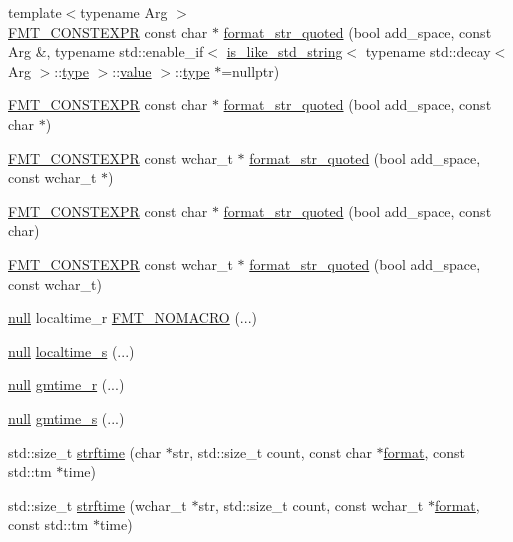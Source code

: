 \begin{DoxyCompactItemize}
\item 
{\footnotesize template$<$typename Arg $>$ }\\\hyperlink{core_8h_a69201cb276383873487bf68b4ef8b4cd}{F\+M\+T\+\_\+\+C\+O\+N\+S\+T\+E\+X\+PR} const char $\ast$ \hyperlink{namespaceinternal_a6b6d89b287d9960295aa6a1a46300b05}{format\+\_\+str\+\_\+quoted} (bool add\+\_\+space, const Arg \&, typename std\+::enable\+\_\+if$<$ \hyperlink{classinternal_1_1is__like__std__string}{is\+\_\+like\+\_\+std\+\_\+string}$<$ typename std\+::decay$<$ Arg $>$\+::\hyperlink{namespaceinternal_a8661864098ac0acff9a6dd7e66f59038}{type} $>$\+::\hyperlink{classinternal_1_1value}{value} $>$\+::\hyperlink{namespaceinternal_a8661864098ac0acff9a6dd7e66f59038}{type} $\ast$=nullptr)
\item 
\hyperlink{core_8h_a69201cb276383873487bf68b4ef8b4cd}{F\+M\+T\+\_\+\+C\+O\+N\+S\+T\+E\+X\+PR} const char $\ast$ \hyperlink{namespaceinternal_aa20fe9d203b6585b35f99cf2b5de3609}{format\+\_\+str\+\_\+quoted} (bool add\+\_\+space, const char $\ast$)
\item 
\hyperlink{core_8h_a69201cb276383873487bf68b4ef8b4cd}{F\+M\+T\+\_\+\+C\+O\+N\+S\+T\+E\+X\+PR} const wchar\+\_\+t $\ast$ \hyperlink{namespaceinternal_a4773ec73cdc3b39cffcdd4035bc5348f}{format\+\_\+str\+\_\+quoted} (bool add\+\_\+space, const wchar\+\_\+t $\ast$)
\item 
\hyperlink{core_8h_a69201cb276383873487bf68b4ef8b4cd}{F\+M\+T\+\_\+\+C\+O\+N\+S\+T\+E\+X\+PR} const char $\ast$ \hyperlink{namespaceinternal_a9ba8863a8d3f90fb4b02f679339ee868}{format\+\_\+str\+\_\+quoted} (bool add\+\_\+space, const char)
\item 
\hyperlink{core_8h_a69201cb276383873487bf68b4ef8b4cd}{F\+M\+T\+\_\+\+C\+O\+N\+S\+T\+E\+X\+PR} const wchar\+\_\+t $\ast$ \hyperlink{namespaceinternal_a058b7ff5306c068d78ebd905aa902886}{format\+\_\+str\+\_\+quoted} (bool add\+\_\+space, const wchar\+\_\+t)
\item 
\hyperlink{structinternal_1_1null}{null} localtime\+\_\+r \hyperlink{namespaceinternal_a5da151108dc35a75dd46a3fa65cc8b94}{F\+M\+T\+\_\+\+N\+O\+M\+A\+C\+RO} (...)
\item 
\hyperlink{structinternal_1_1null}{null} \hyperlink{namespaceinternal_a990db8ce6eb1702f344b5993587f37af}{localtime\+\_\+s} (...)
\item 
\hyperlink{structinternal_1_1null}{null} \hyperlink{namespaceinternal_a6a29b192fce543ff8c18fe7bedf3e321}{gmtime\+\_\+r} (...)
\item 
\hyperlink{structinternal_1_1null}{null} \hyperlink{namespaceinternal_a4df52163db0eff7ab6b17cb243a224b7}{gmtime\+\_\+s} (...)
\item 
std\+::size\+\_\+t \hyperlink{namespaceinternal_a1358037a310a2e6f3d05538df58ff412}{strftime} (char $\ast$str, std\+::size\+\_\+t count, const char $\ast$\hyperlink{locale_8h_a4d9ddd9260f49d99308d41580d169bd2}{format}, const std\+::tm $\ast$time)
\item 
std\+::size\+\_\+t \hyperlink{namespaceinternal_aaa347e326b504b866752fd087f46d2b0}{strftime} (wchar\+\_\+t $\ast$str, std\+::size\+\_\+t count, const wchar\+\_\+t $\ast$\hyperlink{locale_8h_a4d9ddd9260f49d99308d41580d169bd2}{format}, const std\+::tm $\ast$time)
\end{DoxyCompactItemize}
